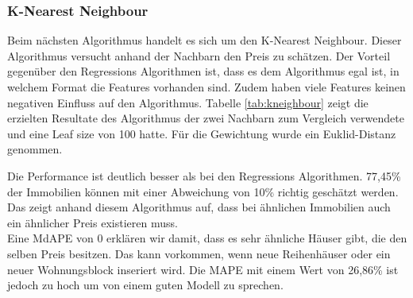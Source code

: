 \subsubsection{K-Nearest Neighbour}
Beim nächsten Algorithmus handelt es sich um den K-Nearest Neighbour. Dieser Algorithmus versucht anhand der Nachbarn den Preis zu schätzen. Der Vorteil gegenüber den Regressions Algorithmen ist, dass es dem Algorithmus egal ist, in welchem Format die Features vorhanden sind. Zudem haben viele Features keinen negativen Einfluss auf den Algorithmus.
Tabelle \ref{tab:kneighbour} zeigt die erzielten Resultate des Algorithmus der zwei Nachbarn zum Vergleich verwendete und eine Leaf size von 100 hatte. Für die Gewichtung wurde ein Euklid-Distanz genommen.\\[2ex]
%
\begin{table}[ht]
\centering
{}
\caption{Ergebnisse vom K-Nearest Neighbour}
\label{tab:regression}
\end{table}
%
Die Performance ist deutlich besser als bei den Regressions Algorithmen. 77,45\% der Immobilien können mit einer Abweichung von 10\% richtig geschätzt werden. Das zeigt anhand diesem Algorithmus auf, dass bei ähnlichen Immobilien auch ein ähnlicher Preis existieren muss.\\
Eine MdAPE von 0 erklären wir damit, dass es sehr ähnliche Häuser gibt, die den selben Preis besitzen. Das kann vorkommen, wenn neue Reihenhäuser oder ein neuer Wohnungsblock inseriert wird. Die MAPE mit einem Wert von 26,86\% ist jedoch zu hoch um von einem guten Modell zu sprechen.\\[2ex]
%
